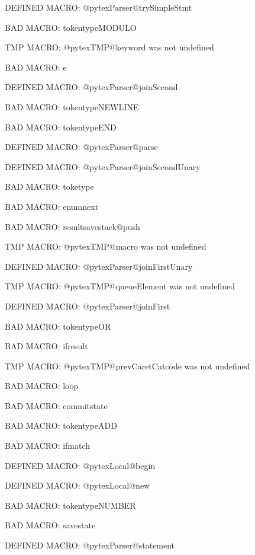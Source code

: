 \ifx\@pytexParser@trySimpleStmt\undefined\else DEFINED MACRO: @pytexParser@trySimpleStmt
\fi

BAD MACRO: tokentypeMODULO

\ifx\@pytexTMP@keyword\undefined\else TMP MACRO: @pytexTMP@keyword was not undefined
\fi

BAD MACRO: e

\ifx\@pytexParser@joinSecond\undefined\else DEFINED MACRO: @pytexParser@joinSecond
\fi

BAD MACRO: tokentypeNEWLINE

BAD MACRO: tokentypeEND

\ifx\@pytexParser@parse\undefined\else DEFINED MACRO: @pytexParser@parse
\fi

\ifx\@pytexParser@joinSecondUnary\undefined\else DEFINED MACRO: @pytexParser@joinSecondUnary
\fi

BAD MACRO: toketype

BAD MACRO: enumnext

BAD MACRO: resultsavestack@push

\ifx\@pytexTMP@macro\undefined\else TMP MACRO: @pytexTMP@macro was not undefined
\fi

\ifx\@pytexParser@joinFirstUnary\undefined\else DEFINED MACRO: @pytexParser@joinFirstUnary
\fi

\ifx\@pytexTMP@queueElement\undefined\else TMP MACRO: @pytexTMP@queueElement was not undefined
\fi

\ifx\@pytexParser@joinFirst\undefined\else DEFINED MACRO: @pytexParser@joinFirst
\fi

BAD MACRO: tokentypeOR

BAD MACRO: ifresult

\ifx\@pytexTMP@prevCaretCatcode\undefined\else TMP MACRO: @pytexTMP@prevCaretCatcode was not undefined
\fi

BAD MACRO: loop

BAD MACRO: commitstate

BAD MACRO: tokentypeADD

BAD MACRO: ifmatch

\ifx\@pytexLocal@begin\undefined\else DEFINED MACRO: @pytexLocal@begin
\fi

\ifx\@pytexLocal@new\undefined\else DEFINED MACRO: @pytexLocal@new
\fi

BAD MACRO: tokentypeNUMBER

BAD MACRO: savestate

\ifx\@pytexParser@statement\undefined\else DEFINED MACRO: @pytexParser@statement
\fi

